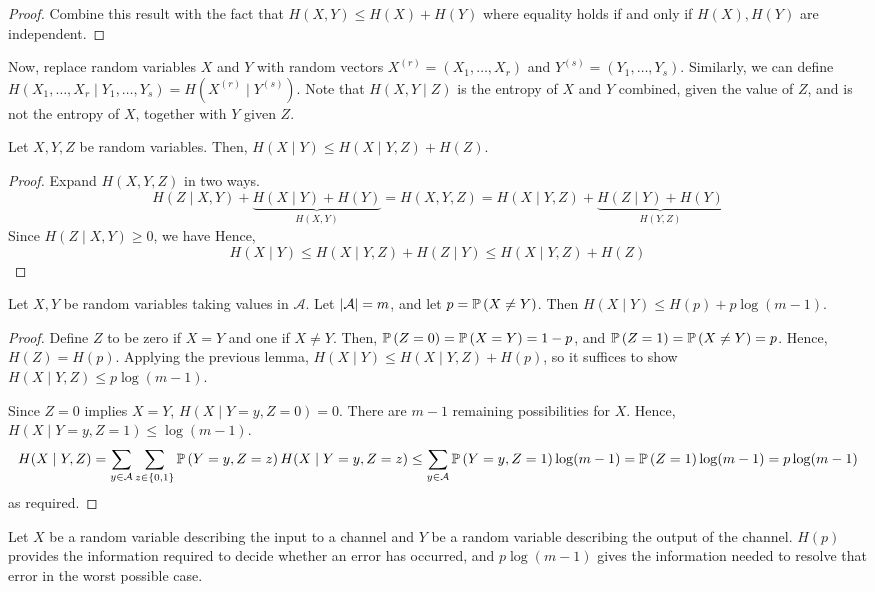 \begin{proof}
    Combine this result with the fact that \( H(X,Y) \leq H(X) + H(Y) \) where equality holds if and only if \( H(X), H(Y) \) are independent.
\end{proof}
Now, replace random variables \( X \) and \( Y \) with random vectors \( X^{(r)} = (X_1, \dots, X_r) \) and \( Y^{(s)} = (Y_1, \dots, Y_s) \).
Similarly, we can define \( H(X_1, \dots, X_r \mid Y_1, \dots, Y_s) = H(X^{(r)} \mid Y^{(s)}) \).
Note that \( H(X,Y\mid Z) \) is the entropy of \( X \) and \( Y \) combined, given the value of \( Z \), and is not the entropy of \( X \), together with \( Y \) given \( Z \).
\begin{lemma}
    Let \( X, Y, Z \) be random variables.
    Then, \( H(X \mid Y) \leq H(X \mid Y, Z) + H(Z) \).
\end{lemma}
\begin{proof}
    Expand \( H(X,Y,Z) \) in two ways.
    \[ H(Z \mid X,Y) + \underbrace{H(X\mid Y) + H(Y)}_{H(X,Y)} = H(X,Y,Z) = H(X \mid Y,Z) + \underbrace{H(Z \mid Y) + H(Y)}_{H(Y,Z)} \]
    Since \( H(Z \mid X,Y) \geq 0 \), we have
    Hence,
    \[ H(X \mid Y) \leq H(X \mid Y,Z) + H(Z \mid Y) \leq H(X \mid Y,Z) + H(Z) \]
\end{proof}
\begin{proposition}
    Let \( X, Y \) be random variables taking values in \( \mathcal A \).
    Let \( \abs{\mathcal A} = m \), and let \( p = \mathbb{P}\left({X \neq Y}\right) \).
    Then \( H(X \mid Y) \leq H(p) + p \log(m-1) \).
\end{proposition}
\begin{proof}
    Define \( Z \) to be zero if \( X = Y \) and one if \( X \neq Y \).
    Then, \( \mathbb{P}\left({Z = 0}\right) = \mathbb{P}\left({X = Y}\right) = 1 - p \), and \( \mathbb{P}\left({Z = 1}\right) = \mathbb{P}\left({X \neq Y}\right) = p \).
    Hence, \( H(Z) = H(p) \).
    Applying the previous lemma, \( H(X \mid Y) \leq H(X \mid Y, Z) + H(p) \), so it suffices to show \( H(X \mid Y, Z) \leq p\log(m-1) \).

    Since \( Z = 0 \) implies \( X = Y \), \( H(X \mid Y = y, Z = 0) = 0 \).
    There are \( m - 1 \) remaining possibilities for \( X \).
    Hence, \( H(X \mid Y = y, Z = 1) \leq \log(m-1) \).
    \[ H(X \mid Y, Z) = \sum_{y \in \mathcal A} \sum_{z \in \qty{0,1}} \mathbb{P}\left({Y = y, Z = z}\right) H(X \mid Y = y, Z = z) \leq \sum_{y \in \mathcal A} \mathbb{P}\left({Y = y, Z = 1}\right) \log(m-1) = \mathbb{P}\left({Z = 1}\right) \log (m-1) = p\log(m-1) \]
    as required.
\end{proof}
Let \( X \) be a random variable describing the input to a channel and \( Y \) be a random variable describing the output of the channel.
\( H(p) \) provides the information required to decide whether an error has occurred, and \( p\log(m-1) \) gives the information needed to resolve that error in the worst possible case.

